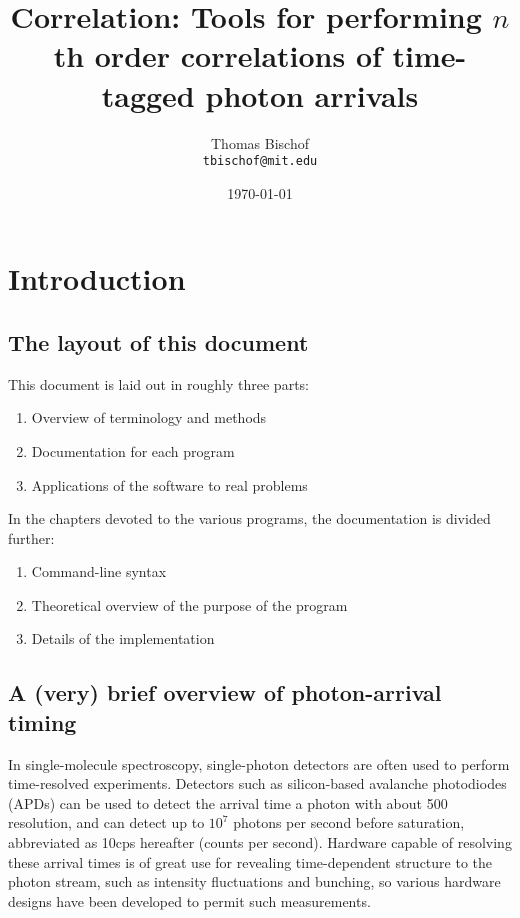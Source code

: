 \documentclass{article}
\title{Correlation: Tools for performing $n$th order correlations of time-tagged photon arrivals}
\author{Thomas Bischof \\ \texttt{tbischof@mit.edu}}
\date{\today}
\newcommand{\cps}{\textnormal{cps}}
\begin{document}
\maketitle
\tableofcontents
 
\section{Introduction}
\subsection{The layout of this document}
This document is laid out in roughly three parts:
\begin{enumerate}
\item Overview of terminology and methods
\item Documentation for each program
\item Applications of the software to real problems
\end{enumerate}
In the chapters devoted to the various programs, the documentation is divided further:
\begin{enumerate}
\item Command-line syntax
\item Theoretical overview of the purpose of the program
\item Details of the implementation
\end{enumerate}

\subsection{A (very) brief overview of photon-arrival timing}
In single-molecule spectroscopy, single-photon detectors are often used to perform time-resolved experiments. Detectors such as silicon-based avalanche photodiodes (APDs) can be used to detect the arrival time a photon with about 500\pico\second{} resolution, and can detect up to $10^{7}$ photons per second before saturation, abbreviated as 10\mega\cps{} hereafter (counts per second). Hardware capable of resolving these arrival times is of great use for revealing time-dependent structure to the photon stream, such as intensity fluctuations and bunching, so various hardware designs have been developed to permit such measurements.
\end{document}
